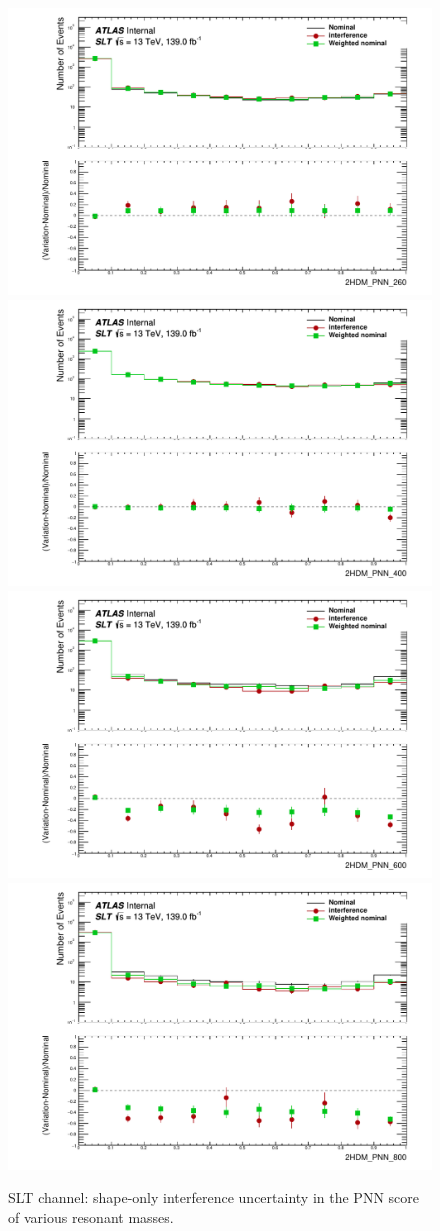 \begin{figure}
\centering       
\includegraphics[width=.45\textwidth]{figures/lephad_modelling_systs/SLT/singletop/interference/Hist_and_ratio_2HDM_PNN_260_Norm}   
\includegraphics[width=.45\textwidth]{figures/lephad_modelling_systs/SLT/singletop/interference/Hist_and_ratio_2HDM_PNN_400_Norm}   \\ 
\includegraphics[width=.45\textwidth]{figures/lephad_modelling_systs/SLT/singletop/interference/Hist_and_ratio_2HDM_PNN_600_Norm}   
\includegraphics[width=.45\textwidth]{figures/lephad_modelling_systs/SLT/singletop/interference/Hist_and_ratio_2HDM_PNN_800_Norm}   \\

\caption{SLT channel: shape-only interference uncertainty in the PNN score of various resonant masses.}
\label{fig:singletopsyst_lephad_interference_PNN_SLT}
\end{figure}

